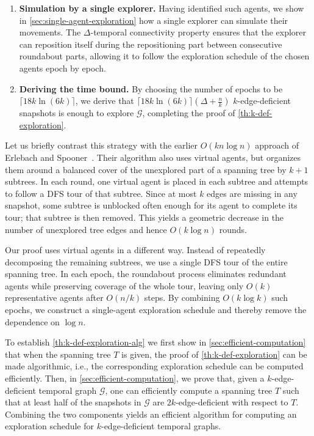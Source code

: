 \documentclass[a4paper,11pt]{article}
\theoremstyle{definition}
\theoremstyle{remark}
\newcommand{\cG}{\ensuremath{\mathcal{G}}}
\begin{document}
\begin{enumerate}[label=\arabic*.]
        \item \textbf{Simulation by a single explorer.}  
        Having identified such agents, we show in \cref{sec:single-agent-exploration} how a single explorer can simulate their movements. 
        The $\Delta$-temporal connectivity property ensures that the explorer can reposition itself during the repositioning part between consecutive roundabout parts, allowing it to follow the exploration schedule of the chosen agents epoch by epoch.

        \item \textbf{Deriving the time bound.}  
        By choosing the number of epochs to be $\lceil 18k \ln{(6k)} \rceil$, we derive that $\lceil 18k \ln{(6k)} \rceil(\Delta+ \frac{n}{k})$ $k$-edge-deficient snapshots is enough to explore $\cG$, completing the proof of \cref{th:k-def-exploration}.
    \end{enumerate}

    Let us briefly contrast this strategy with the earlier $O(kn\log n)$ approach of
    Erlebach and Spooner~\cite{ES22}. Their algorithm also uses virtual agents, but organizes
    them around a balanced cover of the unexplored part of a spanning tree by $k+1$ subtrees.
    In each round, one virtual agent is placed in each subtree and attempts to follow a DFS tour of that subtree. Since at most $k$ edges are missing in any snapshot, some subtree is unblocked often enough for its agent to complete its tour; that subtree is then removed. This yields a geometric decrease in the number of unexplored tree edges and hence $O(k\log n)$ rounds.
    
    Our proof uses virtual agents in a different way. Instead of repeatedly decomposing the
    remaining subtrees, we use a single DFS tour of the entire spanning tree. In each epoch, the roundabout process eliminates redundant agents while preserving coverage of the whole tour, leaving only $O(k)$ representative agents after $O(n/k)$ steps.
    By combining $O(k\log k)$ such epochs, we construct a single-agent exploration schedule and thereby remove the dependence on $\log n$.

    To establish \cref{th:k-def-exploration-alg} we first show in \cref{sec:efficient-computation} that when the spanning tree $T$ is given, the proof of \cref{th:k-def-exploration} can be made algorithmic, i.e., the corresponding exploration schedule can be computed efficiently. 
    Then, in \cref{sec:efficient-computation}, we prove that, given a $k$-edge-deficient temporal graph $\cG$, one can efficiently compute a spanning tree $T$ such that at least half of the snapshots in $\cG$ are $2k$-edge-deficient with respect to $T$. 
    Combining the two components yields an efficient algorithm for computing an exploration schedule for $k$-edge-deficient temporal graphs.
\end{document}
